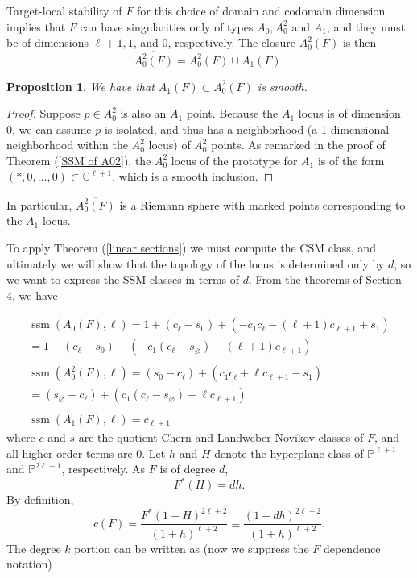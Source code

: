 \documentclass[11pt]{article}
\theoremstyle{plain}
\newtheorem{proposition}[fact]{Proposition}
\theoremstyle{definition}
\theoremstyle{definition}
\newcommand{\bb}[1]{\mathbb{#1}}
\newcommand{\C}{\mathbb{C}}
\let\emptyset\varnothing
\begin{document}
Target-local stability of $F$ for this choice of domain and codomain dimension implies that $F$ can have singularities only of types $A_0,A_0^2$ and $A_1$, and they must be of dimensions $\ell+1,1$, and 0, respectively. The closure $A_0^2(F)$ is then 
\[
\overline{A_0^2(F)} = A_0^2(F) \cup A_1(F).
\]

\begin{proposition}
We have that $A_1(F) \subset A_0^2(F)$ is smooth.
\end{proposition}

\begin{proof}
Suppose $p \in A_0^2$ is also an $A_1$ point. Because the $A_1$ locus is of dimension 0, we can assume $p$ is isolated, and thus has a neighborhood (a 1-dimensional neighborhood  within the $A_0^2$ locus) of $A_0^2$ points. As remarked in the proof of Theorem (\ref{SSM of A02}), the $A_0^2$ locus of the prototype for $A_1$ is of the form $(*,0,\dots,0)\subset \C^{\ell+1}$, which is a smooth inclusion. 

\end{proof}

In particular, $\overline{A_0^2(F)}$ is a Riemann sphere with marked points corresponding to the $A_1$ locus. 

To apply Theorem (\ref{linear sections}) we must compute the CSM class, and ultimately we will show that the topology of the locus is determined only by $d$, so we want to express the SSM classes in terms of $d$. From the theorems of Section 4, we have 

\begin{gather*}
\operatorname{ssm}(A_0(F),\ell) = 1 + (c_\ell-s_0) +(-c_1c_\ell-(\ell+1)c_{\ell+1}+s_1)\\
= 1 + (c_\ell-s_0) +(-c_1(c_\ell-s_\emptyset)-(\ell+1)c_{\ell+1})\\\\
\operatorname{ssm}(A_0^2(F),\ell) = (s_0-c_\ell) + (c_1c_\ell + \ell c_{\ell+1}-s_1) 
\\
=(s_\emptyset-c_\ell)+(c_1(c_\ell-s_\emptyset)+\ell c_{\ell+1})\\\\
\operatorname{ssm}(A_1(F),\ell) = c_{\ell+1} 
\end{gather*}
where $c$ and $s$ are the quotient Chern and Landweber-Novikov classes of $F$, and all higher order terms are 0. Let $h$ and $H$ denote the hyperplane class of $\mathbb P^{\ell+1}$ and $\bb P^{2\ell+1}$, respectively. As $F$ is of degree $d$,
\[
F^*(H)=dh.
\]
By definition, 
\[
c(F) = \frac{F^*(1+H)^{2\ell+2}}{(1+h)^{\ell+2}}\equiv \frac{(1+dh)^{2\ell+2}}{(1+h)^{\ell+2}}.
\]
The degree $k$ portion can be written as (now we suppress the $F$ dependence notation)
\end{document}
